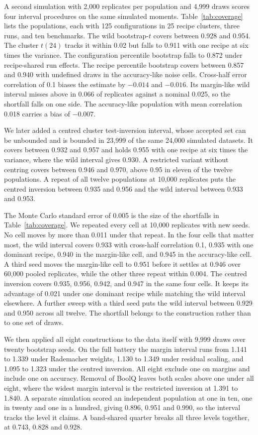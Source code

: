 A second simulation with 2,000 replicates per population and 4,999 draws scores four interval procedures on the same simulated moments. Table~\ref{tab:coverage} lists the populations, each with 125 configurations in 25 recipe clusters, three runs, and ten benchmarks. The wild bootstrap-$t$ covers between 0.928 and 0.954. The cluster $t(24)$ tracks it within 0.02 but falls to 0.911 with one recipe at six times the variance. The configuration percentile bootstrap falls to 0.872 under recipe-shared run effects. The recipe percentile bootstrap covers between 0.857 and 0.940 with undefined draws in the accuracy-like noise cells. Cross-half error correlation of 0.1 biases the estimate by $-0.014$ and $-0.016$. Its margin-like wild interval misses above in 0.066 of replicates against a nominal 0.025, so the shortfall falls on one side. The accuracy-like population with mean correlation 0.018 carries a bias of $-0.007$.

We later added a centred cluster test-inversion interval, whose accepted set can be unbounded and is bounded in 23,999 of the same 24,000 simulated datasets. It covers between 0.932 and 0.957 and holds 0.955 with one recipe at six times the variance, where the wild interval gives 0.930. A restricted variant without centring covers between 0.946 and 0.970, above 0.95 in eleven of the twelve populations. A repeat of all twelve populations at 10,000 replicates puts the centred inversion between 0.935 and 0.956 and the wild interval between 0.933 and 0.953.

The Monte Carlo standard error of 0.005 is the size of the shortfalls in Table~\ref{tab:coverage}. We repeated every cell at 10,000 replicates with new seeds. No cell moves by more than 0.011 under that repeat. In the four cells that matter most, the wild interval covers 0.933 with cross-half correlation 0.1, 0.935 with one dominant recipe, 0.940 in the margin-like cell, and 0.945 in the accuracy-like cell. A third seed moves the margin-like cell to 0.951 before it settles at 0.946 over 60,000 pooled replicates, while the other three repeat within 0.004. The centred inversion covers 0.935, 0.956, 0.942, and 0.947 in the same four cells. It keeps its advantage of 0.021 under one dominant recipe while matching the wild interval elsewhere. A further sweep with a third seed puts the wild interval between 0.929 and 0.950 across all twelve. The shortfall belongs to the construction rather than to one set of draws.

We then applied all eight constructions to the data itself with 9,999 draws over twenty bootstrap seeds. On the full battery the margin interval runs from 1.141 to 1.339 under Rademacher weights, 1.130 to 1.349 under residual scaling, and 1.095 to 1.323 under the centred inversion. All eight exclude one on margins and include one on accuracy. Removal of BoolQ leaves both scales above one under all eight, where the widest margin interval is the restricted inversion at 1.391 to 1.840. A separate simulation scored an independent population at one in ten, one in twenty and one in a hundred, giving 0.896, 0.951 and 0.990, so the interval tracks the level it claims. A band-shared quarter breaks all three levels together, at 0.743, 0.828 and 0.928.

